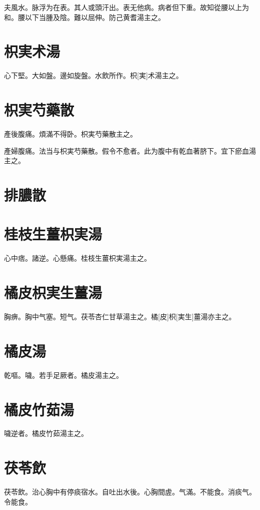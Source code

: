 \documentclass[12pt,twoside,UTF8,b5paper]{ctexbook}
\begin{document}
夫風水。脉浮为在表。其人或頭汗出。表无他病。病者但下重。故知從腰以上为和。腰以下当腫及陰。難以屈伸。防己黄耆湯主之。

\section{枳実术湯}

心下堅。大如盤。邊如旋盤。水飲所作。枳[実]术湯主之。

\section{枳実芍藥散}

產後腹痛。煩滿不得卧。枳実芍藥散主之。

產婦腹痛。法当与枳実芍藥散。假令不愈者。此为腹中有乾血著脐下。宜下瘀血湯主之。

\section{排膿散}

\section{桂枝生薑枳実湯}

心中痞。諸逆。心懸痛。桂枝生薑枳実湯主之。

\section{橘皮枳実生薑湯}

胸痹。胸中气塞。短气。茯苓杏仁甘草湯主之。橘[皮]枳[実生]薑湯亦主之。

\section{橘皮湯}

乾嘔。噦。若手足厥者。橘皮湯主之。

\section{橘皮竹茹湯}

噦逆者。橘皮竹茹湯主之。

\section{茯苓飲}

茯苓飲。治心胸中有停痰宿水。自吐出水後。心胸間虗。气滿。不能食。消痰气。令能食。
\end{document}
